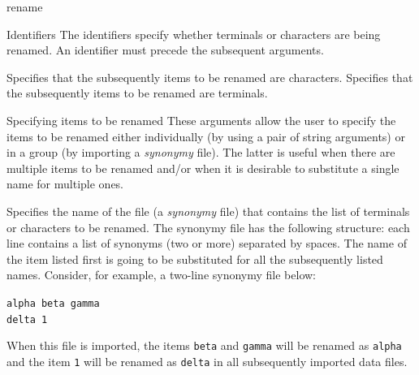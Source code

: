 \begin{command}{rename}{}
    \begin{arguments}
        \begin{argumentgroup}{Identifiers}
            {The identifiers specify whether terminals or characters are being
            renamed. An identifier must precede the subsequent arguments.}
        
                {Specifies that the subsequently items to be renamed are characters.} 
                {}
                {Specifies that the subsequently items to be renamed are terminals.} 
                {}
        \end{argumentgroup}
          
        \begin{argumentgroup}{Specifying items to be renamed}
          {These arguments allow the user to specify the items to be renamed either individually (by 
          using a pair of string arguments) or in a group (by importing a \emph{synonymy} file).
          The latter is useful when there are multiple items to be renamed and/or when it is
          desirable to substitute a single name for  multiple ones.}
          
                {Specifies the name of the file (a \emph{synonymy} file) that contains the list of
                terminals or characters to be renamed. The synonymy file has the following structure:
                each line contains a list of synonyms (two or more) separated by spaces. The name of the
                item listed first is going to be substituted for all the subsequently listed names. Consider,
                for example, a two-line synonymy file below:
                
                \texttt{alpha beta gamma \\
                delta 1\\}
                 
                When this file is imported, the items \texttt{beta} and \texttt{gamma} will be
                renamed as \texttt{alpha} and the item \texttt{1} will be renamed as \texttt{delta}
                in all subsequently imported data files.}
                {}


\end{argumentgroup}
\end{arguments}
\end{command}
